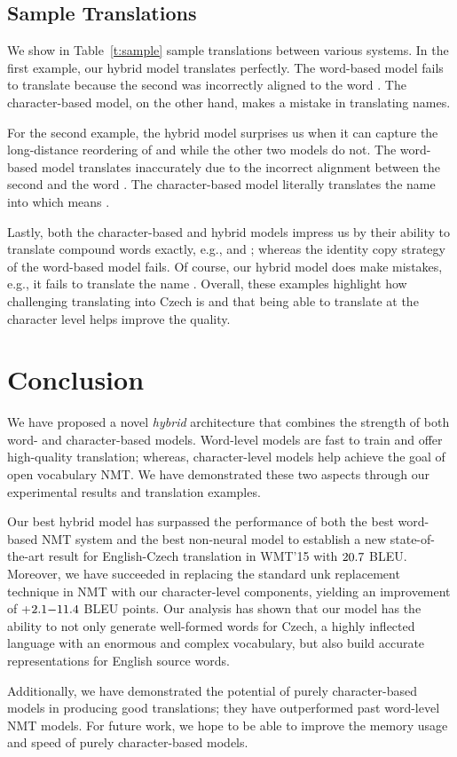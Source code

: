 \subsection{Sample Translations}
\label{subsec:samples}

We show in Table~\ref{t:sample} sample translations between various systems. 
In the first example, our hybrid model translates perfectly. The word-based
model fails to translate  because the second \unk{} was incorrectly
aligned to the word . The character-based model, on the other hand,
makes a mistake in translating names.

For the second example, the hybrid model surprises us when it can capture
the long-distance reordering of  and  while the other two models do not. The word-based model
translates  inaccurately due to the incorrect alignment between the
second \unk{} and the word . The
character-based model literally translates the name  into 
which means .

Lastly, both the character-based and hybrid models impress us by
their ability to translate compound words exactly, e.g.,  and
; whereas the identity copy
strategy of the word-based model fails.
Of course, our hybrid model does make mistakes, e.g., it fails to translate the name
. 
Overall, these examples highlight how challenging translating
into Czech is and that being able to translate at the character level helps
improve the quality.

\section{Conclusion}
\label{sec:conclude}
We have proposed a novel {\it hybrid} architecture that combines the strength
of both word- and character-based models. Word-level models are fast to train
and offer high-quality translation; whereas, character-level models help achieve
the goal of open vocabulary NMT. 
We have demonstrated these two aspects through our experimental results and
translation examples.

Our best hybrid model has surpassed the performance of both the best word-based
NMT system and the best non-neural model to establish a new state-of-the-art result for 
English-Czech translation in WMT'15 with $20.7{}$ BLEU.
Moreover, we have succeeded in replacing the standard unk replacement technique
in NMT with our character-level components, yielding an improvement of 
+$2.1{-}11.4{}$ BLEU points. Our analysis has shown that our model has the ability to
not only generate well-formed words for
Czech, a highly inflected language with an enormous and complex vocabulary, but
also build accurate representations for English source words.

Additionally, we have demonstrated the potential of purely character-based
models in producing good translations;
they have outperformed past word-level NMT models. For future work, we hope to be able to improve the memory usage and
speed of purely character-based models.


